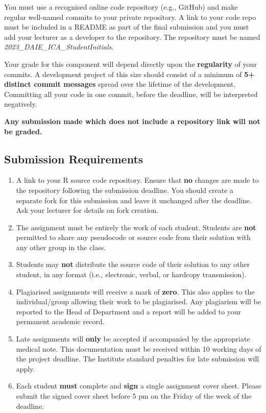 \documentclass[
  letterpaper,
  DIV=11,
  numbers=noendperiod]{scrartcl}
\providecommand{\tightlist}{%
  \setlength{\itemsep}{0pt}\setlength{\parskip}{0pt}}\usepackage{longtable,booktabs,array}
\begin{document}
You must use a recognised online code repository (e.g., GitHub) and make
regular well-named commits to your private repository. A link to your
code repo must be included in a README as part of the final submission
and you must add your lecturer as a developer to the repository. The
repository must be named \emph{2023\_DAIE\_ICA\_StudentInitials}.

Your grade for this component will depend directly upon the
\textbf{regularity} of your commits. A development project of this size
should consist of a minimum of \textbf{5+ distinct commit messages}
spread over the lifetime of the development. Committing all your code in
one commit, before the deadline, will be interpreted negatively.

\textbf{Any submission made which does not include a repository link
will not be graded.}

\hypertarget{submission-requirements}{%
\subsection{Submission Requirements}\label{submission-requirements}}

\begin{enumerate}
\def\labelenumi{\arabic{enumi}.}
\tightlist
\item
  A link to your R source code repository. Ensure that \textbf{no}
  changes are made to the repository following the submission deadline.
  You should create a separate fork for this submission and leave it
  unchanged after the deadline. Ask your lecturer for details on fork
  creation.
\item
  The assignment must be entirely the work of each student. Students are
  \textbf{not} permitted to share any pseudocode or source code from
  their solution with any other group in the class.
\item
  Students may \textbf{not} distribute the source code of their solution
  to any other student, in any format (i.e., electronic, verbal, or
  hardcopy transmission).
\item
  Plagiarised assignments will receive a mark of \textbf{zero}. This
  also applies to the individual/group allowing their work to be
  plagiarised. Any plagiarism will be reported to the Head of Department
  and a report will be added to your permanent academic record.
\item
  Late assignments will \textbf{only} be accepted if accompanied by the
  appropriate medical note. This documentation must be received within
  10 working days of the project deadline. The Institute standard
  penalties for late submission will apply.
\item
  Each student \textbf{must} complete and \textbf{sign} a single
  assignment cover sheet. Please submit the signed cover sheet before 5
  pm on the Friday of the week of the deadline.
\end{enumerate}
\end{document}
